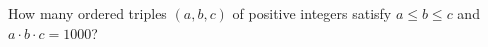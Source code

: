 How many ordered triples $(a, b, c)$ of positive integers satisfy $a \le b \le c$ and $a \cdot b \cdot c = 1000$?
